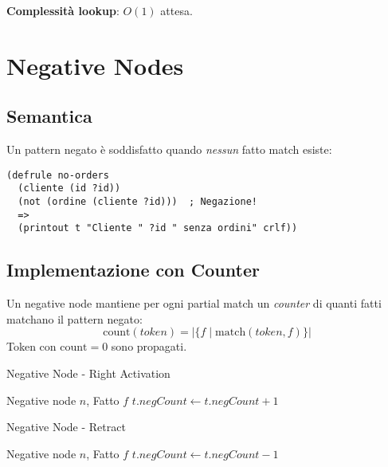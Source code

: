 \textbf{Complessità lookup}: $O(1)$ attesa.

\section{Negative Nodes}

\subsection{Semantica}

Un pattern negato è soddisfatto quando \textit{nessun} fatto match esiste:

\begin{lstlisting}[language=CLIPS]
(defrule no-orders
  (cliente (id ?id))
  (not (ordine (cliente ?id)))  ; Negazione!
  =>
  (printout t "Cliente " ?id " senza ordini" crlf))
\end{lstlisting}

\subsection{Implementazione con Counter}

\begin{definizione}
Un negative node mantiene per ogni partial match un \textit{counter} di quanti fatti matchano il pattern negato:
\begin{equation}
\text{count}(token) = |\{f \mid \text{match}(token, f)\}|
\end{equation}
Token con $\text{count} = 0$ sono propagati.
\end{definizione}

\begin{algorithm}
\caption{Negative Node - Right Activation}
\begin{algorithmic}[1]
\Require Negative node $n$, Fatto $f$
      \State $t.negCount \gets t.negCount + 1$
        
        \State {}
      \EndIf
    \EndIf
  \EndFor
\EndFunction
\end{algorithmic}
\end{algorithm}

\begin{algorithm}
\caption{Negative Node - Retract}
\begin{algorithmic}[1]
\Require Negative node $n$, Fatto $f$
      \State $t.negCount \gets t.negCount - 1$
        
        \State {}
      \EndIf
    \EndIf
  \EndFor
\EndFunction
\end{algorithmic}
\end{algorithm}

